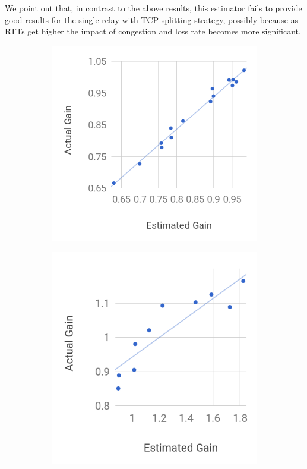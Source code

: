 \documentclass[newfonts=false,format=sigconf,anonymous,10pt,letterpaper]{acmart}
\begin{document}
We point out that, in contrast to the above results, this estimator fails to provide good results for the single relay with TCP splitting strategy, possibly because as RTTs get higher the impact of congestion and loss rate becomes more significant.

\begin{figure}[t]
  \centering
  
    \begin{subfigure}{0.47\columnwidth}
  \centering
  \includegraphics[width=\columnwidth]{figures/gainEstimateVsActual-nat-1hop-newer}
    \caption{}
    \label{fig:rtt-estimate-nat-1hop}
\end{subfigure} \hfill
\begin{subfigure}{0.47\columnwidth}
  \centering
  \includegraphics[width=\columnwidth]{figures/gainEstimateVsActual-ssh-3hop-newer}

\end{subfigure}
\end{figure}
\end{document}
